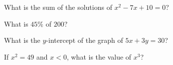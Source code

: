 \begin{exo}{\sprtag}
What is the sum of the solutions of $x^2-7x+10=0$?
\end{exo}
\begin{exo}{}
What is $45\%$ of $200$?
\end{exo}
\begin{exo}[Algebra]{}
What is the $y$-intercept of the graph of $5x+3y=30$?
\end{exo}
\begin{exo}{\sprtag}
If $x^2=49$ and $x<0$, what is the value of $x^3$?
\end{exo}

